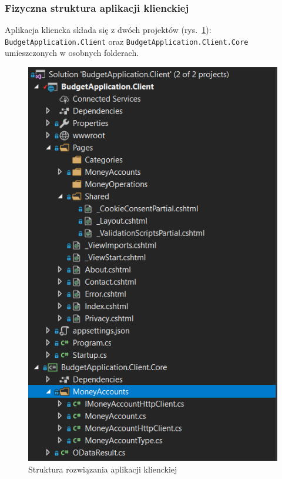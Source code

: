 \subsubsection{Fizyczna struktura aplikacji klienckiej}
Aplikacja kliencka składa się z dwóch projektów (rys.~\ref{fig:fiz-client-2}): \texttt{BudgetApplication.Client} oraz \texttt{BudgetApplication.Client.Core} umieszczonych w osobnych folderach. 
\begin{figure}[htb]
	\centering
	\includegraphics[scale=.77]{rys04/struktura-fizyczna-client-2.PNG}
	\caption{Struktura rozwiązania aplikacji klienckiej}
	\label{fig:fiz-client-2}
\end{figure}


